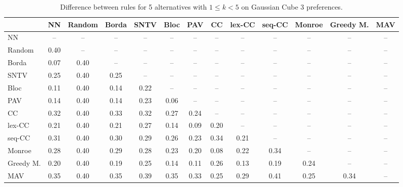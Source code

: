 
\begin{table*}[h!]
\centering
\begin{tabular}{lcccccccccccc}
\toprule
 & NN & Random & Borda & SNTV & Bloc & PAV & CC & lex-CC & seq-CC & Monroe & Greedy M. & MAV \\
\midrule
NN & -- & -- & -- & -- & -- & -- & -- & -- & -- & -- & -- & -- \\
Random & 0.40 & -- & -- & -- & -- & -- & -- & -- & -- & -- & -- & -- \\
Borda & 0.07 & 0.40 & -- & -- & -- & -- & -- & -- & -- & -- & -- & -- \\
SNTV & 0.25 & 0.40 & 0.25 & -- & -- & -- & -- & -- & -- & -- & -- & -- \\
Bloc & 0.11 & 0.40 & 0.14 & 0.22 & -- & -- & -- & -- & -- & -- & -- & -- \\
PAV & 0.14 & 0.40 & 0.14 & 0.23 & 0.06 & -- & -- & -- & -- & -- & -- & -- \\
CC & 0.32 & 0.40 & 0.33 & 0.32 & 0.27 & 0.24 & -- & -- & -- & -- & -- & -- \\
lex-CC & 0.21 & 0.40 & 0.21 & 0.27 & 0.14 & 0.09 & 0.20 & -- & -- & -- & -- & -- \\
seq-CC & 0.31 & 0.40 & 0.30 & 0.29 & 0.26 & 0.23 & 0.34 & 0.21 & -- & -- & -- & -- \\
Monroe & 0.28 & 0.40 & 0.29 & 0.28 & 0.23 & 0.20 & 0.08 & 0.22 & 0.34 & -- & -- & -- \\
Greedy M. & 0.20 & 0.40 & 0.19 & 0.25 & 0.14 & 0.11 & 0.26 & 0.13 & 0.19 & 0.24 & -- & -- \\
MAV & 0.35 & 0.40 & 0.35 & 0.39 & 0.35 & 0.33 & 0.25 & 0.29 & 0.41 & 0.25 & 0.34 & -- \\
\bottomrule
\end{tabular}

\caption{Difference between rules for 5 alternatives with $1 \leq k < 5$ on Gaussian Cube 3 preferences.}
\end{table*}
